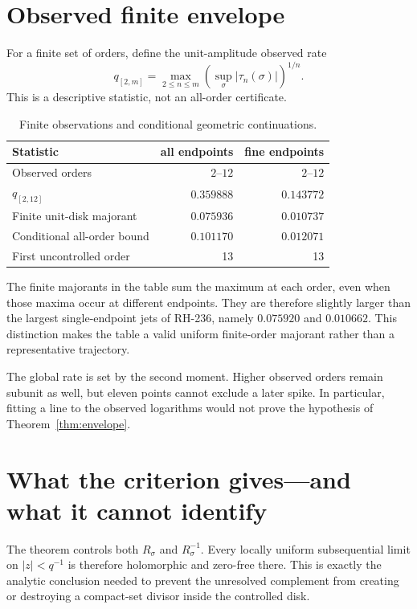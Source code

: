 \documentclass[11pt]{article}
\theoremstyle{remark}
\begin{document}
\section{Observed finite envelope}

For a finite set of orders, define the unit-amplitude observed rate
\[
 q_{[2,m]}=\max_{2\le n\le m}
 \left(\sup_\sigma|\tau_n(\sigma)|\right)^{1/n}.
\]
This is a descriptive statistic, not an all-order certificate.

\begin{table}[ht]
\centering
\small
\begin{tabular}{lrr}
\toprule
Statistic & all endpoints & fine endpoints\\
\midrule
Observed orders & $2$--$12$ & $2$--$12$\\
$q_{[2,12]}$ & $0.359888$ & $0.143772$\\
Finite unit-disk majorant & $0.075936$ & $0.010737$\\
Conditional all-order bound & $0.101170$ & $0.012071$\\
First uncontrolled order & 13 & 13\\
\bottomrule
\end{tabular}
\caption{Finite observations and conditional geometric continuations.}
\end{table}

The finite majorants in the table sum the maximum at each order, even when
those maxima occur at different endpoints.  They are therefore slightly
larger than the largest single-endpoint jets of RH-236, namely $0.075920$ and
$0.010662$.  This distinction makes the table a valid uniform finite-order
majorant rather than a representative trajectory.

The global rate is set by the second moment.  Higher observed orders remain
subunit as well, but eleven points cannot exclude a later spike.  In
particular, fitting a line to the observed logarithms would not prove the
hypothesis of Theorem~\ref{thm:envelope}.

\section{What the criterion gives---and what it cannot identify}

The theorem controls both $R_\sigma$ and $R_\sigma^{-1}$.  Every locally
uniform subsequential limit on $|z|<q^{-1}$ is therefore holomorphic and
zero-free there.  This is exactly the analytic conclusion needed to prevent
the unresolved complement from creating or destroying a compact-set divisor
inside the controlled disk.
\end{document}
